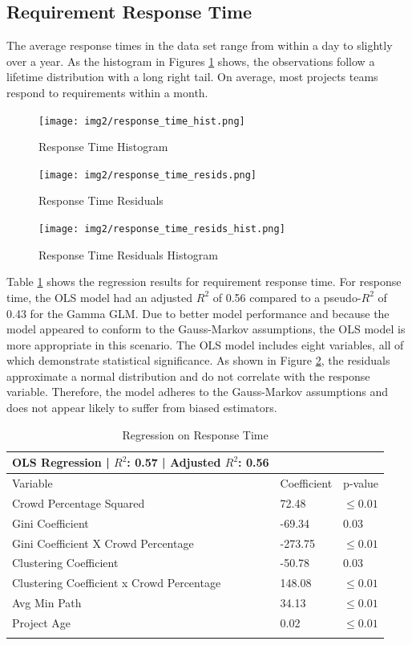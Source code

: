 \subsection{Requirement Response Time}

The average response times in the data set range from within a day to slightly over a year. As the histogram in Figures \ref{response_time_hist} shows, the observations follow a lifetime distribution with a long right tail. On average, most projects teams respond to requirements within a month.

\begin{figure}
  \texttt{[image: img2/response\_time\_hist.png]}
\caption{Response Time Histogram}
\label{response_time_hist}
\end{figure}

\begin{figure}
  \texttt{[image: img2/response\_time\_resids.png]}
\caption{Response Time Residuals}
\label{response_time_resids}
\end{figure}

\begin{figure}
  \texttt{[image: img2/response\_time\_resids\_hist.png]}
\caption{Response Time Residuals Histogram}
\label{response_time_resids_results}
\end{figure}

Table \ref{reaction_time_regression} shows the regression results for requirement response time. For response time, the OLS model had an adjusted $R^2$ of 0.56 compared to a pseudo-$R^2$ of 0.43 for the Gamma GLM. Due to better model performance and because the model appeared to conform to the Gauss-Markov assumptions, the OLS model is more appropriate in this scenario. The OLS model includes eight variables, all of which demonstrate statistical significance. As shown in Figure \ref{response_time_resids}, the residuals approximate a normal distribution and do not correlate with the response variable. Therefore, the model adheres to the Gauss-Markov assumptions and does not appear likely to suffer from biased estimators.

\begin{table}
\caption{Regression on Response Time}
\label{reaction_time_regression}
\begin{tabular}{lll}
OLS Regression | $R^2$: 0.57 | Adjusted $R^2$: 0.56 \\
\hline\noalign{\smallskip}
Variable & Coefficient & p-value  \\
\noalign{\smallskip}\hline\noalign{\smallskip}
Crowd Percentage Squared & 72.48 & $\leq 0.01$ \\
Gini Coefficient & -69.34 & 0.03 \\
Gini Coefficient X Crowd Percentage & -273.75 & $\leq 0.01$ \\
Clustering Coefficient & -50.78 & 0.03 \\
Clustering Coefficient x Crowd Percentage & 148.08 & $\leq 0.01$ \\
Avg Min Path & 34.13 & $\leq 0.01$ \\
Project Age & 0.02 & $\leq 0.01$ \\
\noalign{\smallskip}\hline
\end{tabular}
\end{table}

